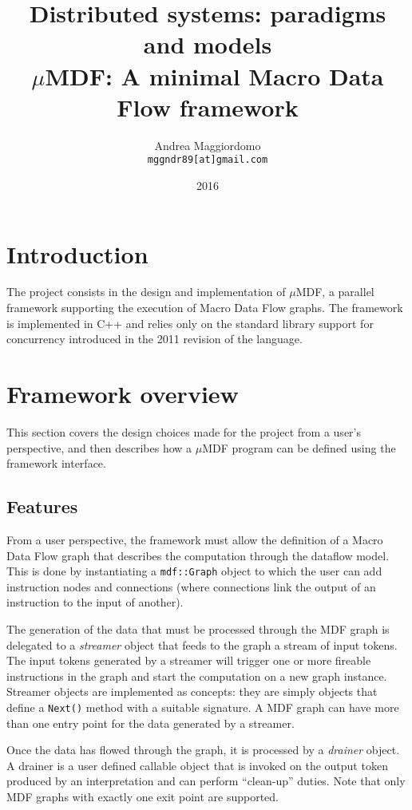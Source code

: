 \documentclass[a4paper, 11pt, oneside]{article}
\title{{\Large Distributed systems: paradigms and models} \\[3mm] {\LARGE $\mu$MDF: A minimal Macro Data Flow framework} \\[3mm]}
\author{Andrea Maggiordomo \\ \texttt{mggndr89[at]gmail.com}}
\date{2016}
\begin{document}
\maketitle

\section{Introduction}

The project consists in the design and implementation of $\mu$MDF, a parallel framework supporting the execution of Macro Data Flow graphs. The framework is implemented in C++ and relies only on the standard library support for concurrency introduced in the 2011 revision of the language.

\section{Framework overview}

This section covers the design choices made for the project from a user's perspective, and then describes how a $\mu$MDF program can be defined using the framework interface.

\subsection{Features}

From a user perspective, the framework must allow the definition of a Macro Data Flow graph that describes the computation through the dataflow model. This is done by instantiating a \texttt{mdf::Graph} object to which the user can add instruction nodes and connections (where connections link the output of an instruction to the input of another).

The generation of the data that must be processed through the MDF graph is delegated to a \emph{streamer} object that feeds to the graph a stream of input tokens. The input tokens generated by a streamer will trigger one or more fireable instructions in the graph and start the computation on a new graph instance. Streamer objects are implemented as concepts: they are simply objects that define a \texttt{Next()} method with a suitable signature. A MDF graph can have more than one entry point for the data generated by a streamer.

Once the data has flowed through the graph, it is processed by a \emph{drainer} object. A drainer is a user defined callable object that is invoked on the output token produced by an interpretation and can perform ``clean-up'' duties. Note that only MDF graphs with exactly one exit point are supported.
\end{document}
